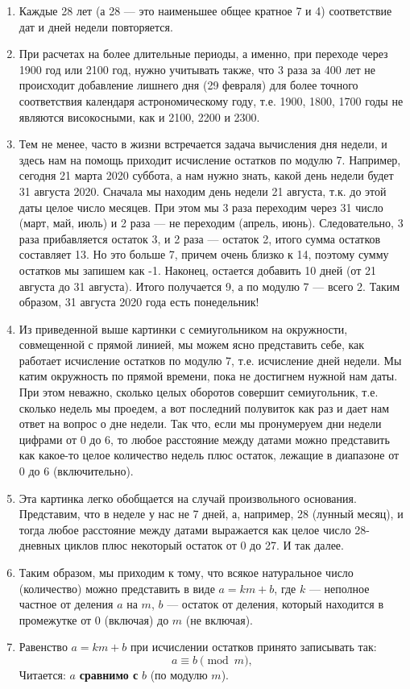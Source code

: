 \begin{enumerate}
\item Каждые 28 лет (а 28 --- это наименьшее общее кратное 7 и 4) соответствие дат и дней недели повторяется.
\item При расчетах на более длительные периоды, а именно, при переходе через 1900 год или 2100 год, нужно учитывать также, что 3 раза за 400 лет не происходит добавление лишнего дня (29 февраля) для более точного соответствия календаря астрономическому году, т.е. 1900, 1800, 1700 годы не являются високосными, как и 2100, 2200 и 2300.
\item Тем не менее, часто в жизни встречается задача вычисления дня недели, и здесь нам на помощь приходит исчисление остатков по модулю 7. Например, сегодня 21 марта 2020 суббота, а нам нужно знать, какой день недели будет 31 августа 2020. Сначала мы находим день недели 21 августа, т.к. до этой даты целое число месяцев. При этом мы 3 раза переходим через 31 число (март, май, июль) и 2 раза --- не переходим (апрель, июнь). Следовательно, 3 раза прибавляется остаток 3, и 2 раза --- остаток 2, итого сумма остатков составляет 13. Но это больше 7, причем очень близко к 14, поэтому сумму остатков мы запишем как -1. Наконец, остается добавить 10 дней (от 21 августа до 31 августа). Итого получается 9, а по модулю 7 --- всего 2. Таким образом, 31 августа 2020 года есть понедельник!
\item Из приведенной выше картинки с семиугольником на окружности, совмещенной с прямой линией, мы можем ясно представить себе, как работает исчисление остатков по модулю 7, т.е. исчисление дней недели. Мы катим окружность по прямой времени, пока не достигнем нужной нам даты. При этом неважно, сколько целых оборотов совершит семиугольник, т.е. сколько недель мы проедем, а вот последний полувиток как раз и дает нам ответ на вопрос о дне недели. Так что, если мы пронумеруем дни недели цифрами от 0 до 6, то любое расстояние между датами можно представить как какое-то целое количество недель плюс остаток, лежащие в диапазоне от 0 до 6 (включительно).
\item Эта картинка легко обобщается на случай произвольного основания. Представим, что в неделе у нас не 7 дней, а, например, 28 (лунный месяц), и тогда любое расстояние между датами выражается как целое число 28-дневных циклов плюс некоторый остаток от 0 до 27. И так далее.
\item Таким образом, мы приходим к тому, что всякое натуральное число (количество) можно представить в виде $a=km+b$, где $k$ --- неполное частное от деления $a$ на $m$, $b$ --- остаток от деления, который находится в промежутке от 0 (включая) до $m$ (не включая).
\item Равенство $a=km+b$ при исчислении остатков принято записывать так:
$$
a\equiv b\pmod m,
$$
Читается: $a$ \textbf{сравнимо с} $b$ (по модулю $m$).


\end{enumerate}
